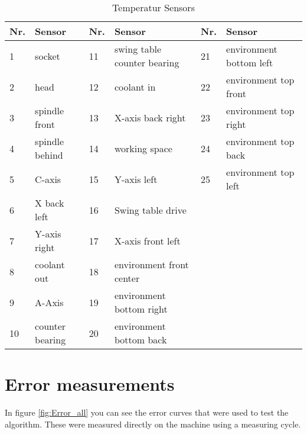 \begin{table}[!htb]
\centering
\begin{threeparttable}
\caption[Temperatur Sensors]{Temperatur Sensors}
\begin{tabular}{l l l l l l}
\hline
Nr.  & Sensor \hspace{2.8cm} & Nr. & Sensor \hspace{3cm} & Nr. & Sensor\\
  \hline \vspace{-0.2cm}
1 & socket & 11 & swing table counter bearing & 21 & environment bottom left\\ \vspace{-0.2cm}
2 & head & 12 & coolant in & 22 & environment top front\\ \vspace{-0.2cm}
3 & spindle front & 13 & X-axis back right & 23 & environment top right\\ \vspace{-0.2cm}
4 & spindle behind & 14 & working space & 24 & environment top back\\ \vspace{-0.2cm}
5 & C-axis & 15 & Y-axis left & 25 & environment top left\\ \vspace{-0.2cm}
6 & X back left & 16 & Swing table drive\\ \vspace{-0.2cm}
7 & Y-axis right & 17 & X-axis front left\\ \vspace{-0.2cm}
8 & coolant out & 18 & environment front center\\ \vspace{-0.2cm}
9 & A-Axis & 19 & environment bottom right \\
10 & counter bearing & 20 & environment bottom back\\
\hline
\end{tabular}
\label{Tab:temps_sensors}
\end{threeparttable}
\end{table}

\newpage


\section{Error measurements}
\label{apx:Error_meas}

In figure \ref{fig:Error_all} you can see the error curves that were used to test the algorithm. These were measured directly on the machine using a measuring cycle.

